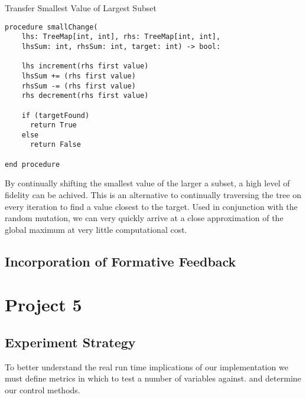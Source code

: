 \documentclass[a4paper]{article}
\begin{document}
\makeatletter
\renewcommand{\ALG@name}{Small Change}
\makeatother
\setcounter{algorithm}{0}


\begin{algorithm}
\caption{Transfer Smallest Value of Largest Subset}\label{euclid}

\begin{verbatim}
procedure smallChange(
    lhs: TreeMap[int, int], rhs: TreeMap[int, int], 
    lhsSum: int, rhsSum: int, target: int) -> bool:

    lhs increment(rhs first value)
    lhsSum += (rhs first value)
    rhsSum -= (rhs first value)
    rhs decrement(rhs first value)
    
    if (targetFound)
      return True
    else
      return False 
    
end procedure
\end{verbatim}
\end{algorithm}

By continually shifting the smallest value of the larger a subset, 
a high level of fidelity can be achived. This is an alternative to 
continually traversing the tree on every iteration to find a value closest to 
the target. Used in conjunction with the random mutation, we can very quickly arrive at a close 
approximation of the global maximum at very little computational cost. 


\subsection{Incorporation of Formative Feedback}

\newpage


\section{Project 5}

\subsection{Experiment Strategy}
\vspace{8mm}
To better understand the real run time implications of our implementation 
we must define metrics in which to test a number of variables against. and determine
our control methods.\\
\end{document}
